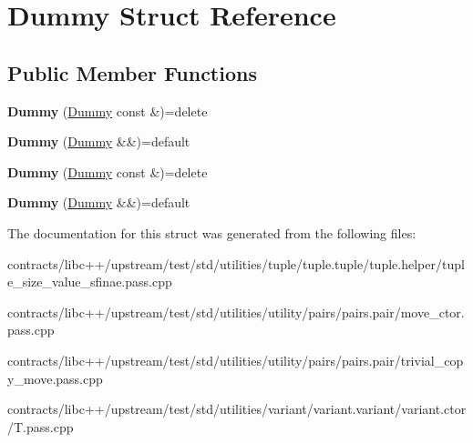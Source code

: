 \hypertarget{struct_dummy}{}\section{Dummy Struct Reference}
\label{struct_dummy}
\subsection*{Public Member Functions}
\begin{DoxyCompactItemize}
\item 
\mbox{\label{struct_dummy_a9c17b069fc0ed6a79a5f3036358017ef}} 
{\bfseries Dummy} (\mbox{\hyperlink{struct_dummy}{Dummy}} const \&)=delete
\item 
\mbox{\label{struct_dummy_a30b86a8f85716477772c2c89c919f6d3}} 
{\bfseries Dummy} (\mbox{\hyperlink{struct_dummy}{Dummy}} \&\&)=default
\item 
\mbox{\label{struct_dummy_a9c17b069fc0ed6a79a5f3036358017ef}} 
{\bfseries Dummy} (\mbox{\hyperlink{struct_dummy}{Dummy}} const \&)=delete
\item 
\mbox{\label{struct_dummy_a30b86a8f85716477772c2c89c919f6d3}} 
{\bfseries Dummy} (\mbox{\hyperlink{struct_dummy}{Dummy}} \&\&)=default
\end{DoxyCompactItemize}


The documentation for this struct was generated from the following files\+:\begin{DoxyCompactItemize}
\item 
contracts/libc++/upstream/test/std/utilities/tuple/tuple.\+tuple/tuple.\+helper/tuple\+\_\+size\+\_\+value\+\_\+sfinae.\+pass.\+cpp\item 
contracts/libc++/upstream/test/std/utilities/utility/pairs/pairs.\+pair/move\+\_\+ctor.\+pass.\+cpp\item 
contracts/libc++/upstream/test/std/utilities/utility/pairs/pairs.\+pair/trivial\+\_\+copy\+\_\+move.\+pass.\+cpp\item 
contracts/libc++/upstream/test/std/utilities/variant/variant.\+variant/variant.\+ctor/T.\+pass.\+cpp\end{DoxyCompactItemize}
